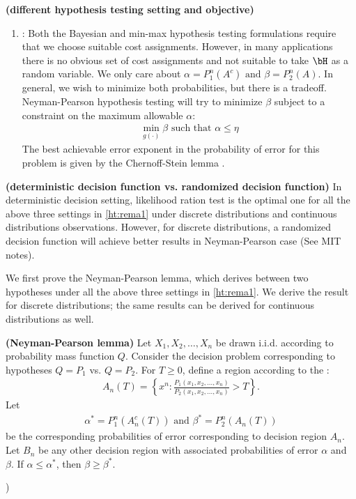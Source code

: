 \documentclass{article}
\newcommand{\bfs}[1]{\textbf{({#1})}}
\begin{document}
\begin{rema}{\bfs{different hypothesis testing setting and objective}}
\begin{enumerate}
    \item {}: Both the  Bayesian and min-max hypothesis testing formulations require that we choose suitable cost assignments. However, in many applications there is no obvious set of cost assignments and not suitable to take $\bH$ as a random variable. We only care about $\alpha=P_{1}^{n}\left(A^{c}\right) \text{ and } \beta=P_{2}^{n}\left(A\right).$ In general, we wish to minimize both probabilities, but there is a tradeoff. Neyman-Pearson hypothesis testing will try to minimize $\beta$ subject to a constraint on the maximum allowable $\alpha$:
    \begin{align}
    \min _{g(\cdot)} \beta \text { such that } \alpha \leq \eta
    \end{align}
    The best achievable error exponent in the probability of error for this problem is given by the Chernoff-Stein lemma \blue{[cref]}.
\end{enumerate}
\end{rema}

\begin{rema}{\bfs{deterministic decision function vs. randomized decision function}} In deterministic decision setting, likelihood ration test is the optimal one for all the above three settings in \cref{ht:rema1} under discrete distributions and continuous distributions observations. However, for discrete distributions, a randomized decision function will achieve better results in Neyman-Pearson case (See MIT notes).
\end{rema}


We first prove the Neyman-Pearson lemma, which derives  between two hypotheses under all the above three settings in \cref{ht:rema1}. We derive the result for discrete distributions; the same results can be derived for continuous distributions as well.


\begin{thma}{\bfs{Neyman-Pearson lemma}}\label{ht:thm1}
 Let $X_{1}, X_{2}, \ldots, X_{n}$ be
drawn i.i.d. according to probability mass function $Q .$ Consider the decision problem corresponding to hypotheses $Q=P_{1}$ vs. $Q=P_{2}$. For $T \geq 0$, define a region according to the :
\begin{align}
A_{n}(T)=\left\{x^{n}: \frac{P_{1}\left(x_{1}, x_{2}, \ldots, x_{n}\right)}{P_{2}\left(x_{1}, x_{2}, \ldots, x_{n}\right)}>T\right\}. \label{ht:eq2}
\end{align}
Let
\begin{align*}
\alpha^{*}=P_{1}^{n}\left(A_{n}^{c}(T)\right) \text{ and } \beta^{*}=P_{2}^{n}\left(A_{n}(T)\right)
\end{align*}
be the corresponding probabilities of error corresponding to decision region $A_{n}$. Let $B_{n}$ be any other decision region with associated probabilities of error $\alpha$ and $\beta .$ If $\alpha \leq \alpha^{*}$, then $\beta \geq \beta^{*}$.
\end{thma}) 
\end{document}
